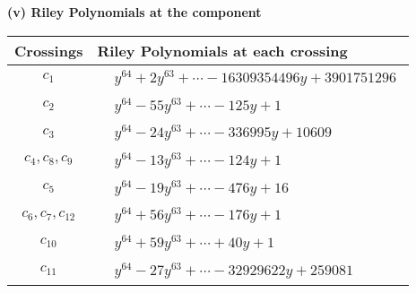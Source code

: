 \documentclass[1p]{elsarticle_modified}
\theoremstyle{definition}
\begin{document}
\newpage\renewcommand{\arraystretch}{1}
\flushleft \textbf{(v) Riley Polynomials at the component}\newline \\
\begin{tabular}{m{50pt}|m{274pt}}
Crossings & \hspace{64pt}Riley Polynomials at each crossing \\
\hline $$\begin{aligned}c_{1}\end{aligned}$$&$\begin{aligned}
&y^{64}+2 y^{63}+\cdots-16309354496 y+3901751296
\end{aligned}$\\
\hline $$\begin{aligned}c_{2}\end{aligned}$$&$\begin{aligned}
&y^{64}-55 y^{63}+\cdots-125 y+1
\end{aligned}$\\
\hline $$\begin{aligned}c_{3}\end{aligned}$$&$\begin{aligned}
&y^{64}-24 y^{63}+\cdots-336995 y+10609
\end{aligned}$\\
\hline $$\begin{aligned}c_{4},c_{8},c_{9}\end{aligned}$$&$\begin{aligned}
&y^{64}-13 y^{63}+\cdots-124 y+1
\end{aligned}$\\
\hline $$\begin{aligned}c_{5}\end{aligned}$$&$\begin{aligned}
&y^{64}-19 y^{63}+\cdots-476 y+16
\end{aligned}$\\
\hline $$\begin{aligned}c_{6},c_{7},c_{12}\end{aligned}$$&$\begin{aligned}
&y^{64}+56 y^{63}+\cdots-176 y+1
\end{aligned}$\\
\hline $$\begin{aligned}c_{10}\end{aligned}$$&$\begin{aligned}
&y^{64}+59 y^{63}+\cdots+40 y+1
\end{aligned}$\\
\hline $$\begin{aligned}c_{11}\end{aligned}$$&$\begin{aligned}
&y^{64}-27 y^{63}+\cdots-32929622 y+259081
\end{aligned}$\\
\hline
\end{tabular}\\~\\
\end{document}
